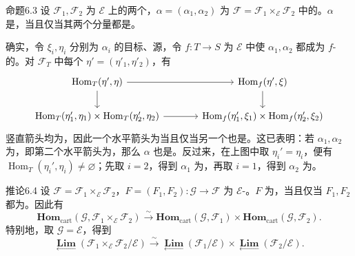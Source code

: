 \begin{SGAresult}{命题}{6.3}
设 $\mathcal F_1,\mathcal F_2$ 为 $\mathcal E$ 上的两个，$\alpha=(\alpha_1,\alpha_2)$ 为 $\mathcal F=\mathcal F_1\times_{\mathcal E}\mathcal F_2$ 中的。$\alpha$ 是，当且仅当其两个分量都是。
\end{SGAresult}
确实，令 $\xi_i,\eta_i$ 分别为 $\alpha_i$ 的目标、源，令 $f:T\to S$ 为 $\mathcal E$ 中使 $\alpha_1,\alpha_2$ 都成为 $f$-的。对 $\mathcal F_T$ 中每个 $\eta'=(\eta'_1,\eta'_2)$，有
\[
\begin{tikzcd}[column sep=large]
\operatorname{Hom}_T(\eta',\eta)\arrow[r]\arrow[d]&\operatorname{Hom}_f(\eta',\xi)\arrow[d]\\
\operatorname{Hom}_T(\eta'_1,\eta_1)\times\operatorname{Hom}_T(\eta'_2,\eta_2)\arrow[r]&
\operatorname{Hom}_f(\eta'_1,\xi_1)\times\operatorname{Hom}_f(\eta'_2,\xi_2)
\end{tikzcd}
\]
竖直箭头均为，因此一个水平箭头为当且仅当另一个也是。这已表明：若 $\alpha_1,\alpha_2$ 为，即第二个水平箭头为，那么 $\alpha$ 也是。反过来，在上图中取 $\eta_i'=\eta_i$，便有 $\operatorname{Hom}_T(\eta_i',\eta_i)\ne\varnothing$；先取 $i=2$，得到 $\alpha_1$ 为，再取 $i=1$，得到 $\alpha_2$ 为。

\begin{SGAresult}{推论}{6.4}
设 $\mathcal F=\mathcal F_1\times_{\mathcal E}\mathcal F_2$，$F=(F_1,F_2):\mathcal G\to\mathcal F$ 为 $\mathcal E$-。$F$ 为，当且仅当 $F_1,F_2$ 都为。因此有
\[
 \mathbf{Hom}_{\mathrm{cart}}(\mathcal G,\mathcal F_1\times_{\mathcal E}\mathcal F_2)
 \xrightarrow{\sim}\mathbf{Hom}_{\mathrm{cart}}(\mathcal G,\mathcal F_1)\times
 \mathbf{Hom}_{\mathrm{cart}}(\mathcal G,\mathcal F_2).
\]
特别地，取 $\mathcal G=\mathcal E$，得到
\[
 \mathop{\mathbf{Lim}}\limits_{\longleftarrow}(\mathcal F_1\times_{\mathcal E}\mathcal F_2/\mathcal E)
 \xrightarrow{\sim}\mathop{\mathbf{Lim}}\limits_{\longleftarrow}(\mathcal F_1/\mathcal E)
 \times\mathop{\mathbf{Lim}}\limits_{\longleftarrow}(\mathcal F_2/\mathcal E).
\]
\end{SGAresult}

